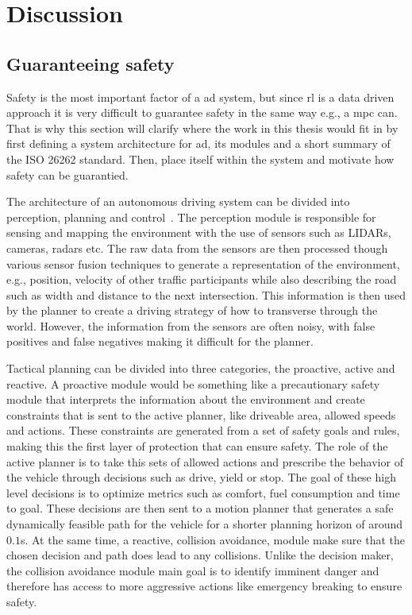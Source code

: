 \chapter{Discussion}
\label{sec:discussion}


\section{Guaranteeing safety}
\label{sec:system_architecture}
Safety is the most important factor of a \gls{ad} system, but since \gls{rl} is a data driven approach it is very difficult to guarantee safety \cite{tbd} in the same way e.g., a \gls{mpc} can. That is why this section will clarify where the work in this thesis would fit in by first defining a system architecture for \gls{ad}, its modules and a short summary of the ISO 26262 standard. Then, place itself within the system and motivate how safety can be guarantied. 

The architecture of an autonomous driving system can be divided into perception, planning and control~\cite{Schwarting2018,Kortenkamp2008}.
The perception module is responsible for sensing and mapping the environment with the use of sensors such as LIDARs, cameras, radars etc. The raw data from the sensors are then processed though various sensor fusion techniques to generate a representation of the environment, e.g., position, velocity of other traffic participants while also describing the road such as width and distance to the next intersection. This information is then used by the planner to create a driving strategy of how to transverse through the world. However, the information from the sensors are often noisy, with false positives and false negatives making it difficult for the planner.

Tactical planning can be divided into three categories, the proactive, active and reactive. A proactive module would be something like a precautionary safety module that interprets the information about the environment and create constraints that is sent to the active planner, like  driveable area, allowed speeds and actions. These constraints are generated from a set of safety goals and rules, making this the first layer of protection that can ensure safety. 
The role of the active planner is to take this sets of allowed actions and prescribe the behavior of the vehicle through decisions such as drive, yield or stop. The goal of these high level decisions is to optimize metrics such as comfort, fuel consumption and time to goal. These decisions are then sent to a motion planner that generates a safe dynamically feasible path for the vehicle for a shorter planning horizon of around $0.1$s. 
At the same time, a reactive, collision avoidance, module make sure that the chosen decision and path does lead to any collisions. Unlike the decision maker, the collision avoidance module main goal is to identify imminent danger and therefore has access to more aggressive actions like emergency breaking to ensure safety. 
 
